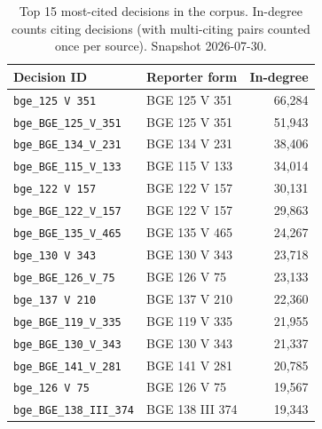\begin{table}[H]
\centering
\caption{Top 15 most-cited decisions in the corpus. In-degree counts citing decisions (with multi-citing pairs counted once per source). Snapshot 2026-07-30.}
\label{tab:top_cited}
\small
\begin{tabular}{l l r}
\toprule
\textbf{Decision ID} & \textbf{Reporter form} & \textbf{In-degree} \\
\midrule
\texttt{bge\_125 V 351} & BGE 125 V 351 & 66,284 \\
\texttt{bge\_BGE\_125\_V\_351} & BGE 125 V 351 & 51,943 \\
\texttt{bge\_BGE\_134\_V\_231} & BGE 134 V 231 & 38,406 \\
\texttt{bge\_BGE\_115\_V\_133} & BGE 115 V 133 & 34,014 \\
\texttt{bge\_122 V 157} & BGE 122 V 157 & 30,131 \\
\texttt{bge\_BGE\_122\_V\_157} & BGE 122 V 157 & 29,863 \\
\texttt{bge\_BGE\_135\_V\_465} & BGE 135 V 465 & 24,267 \\
\texttt{bge\_130 V 343} & BGE 130 V 343 & 23,718 \\
\texttt{bge\_BGE\_126\_V\_75} & BGE 126 V 75 & 23,133 \\
\texttt{bge\_137 V 210} & BGE 137 V 210 & 22,360 \\
\texttt{bge\_BGE\_119\_V\_335} & BGE 119 V 335 & 21,955 \\
\texttt{bge\_BGE\_130\_V\_343} & BGE 130 V 343 & 21,337 \\
\texttt{bge\_BGE\_141\_V\_281} & BGE 141 V 281 & 20,785 \\
\texttt{bge\_126 V 75} & BGE 126 V 75 & 19,567 \\
\texttt{bge\_BGE\_138\_III\_374} & BGE 138 III 374 & 19,343 \\
\bottomrule
\end{tabular}
\end{table}
